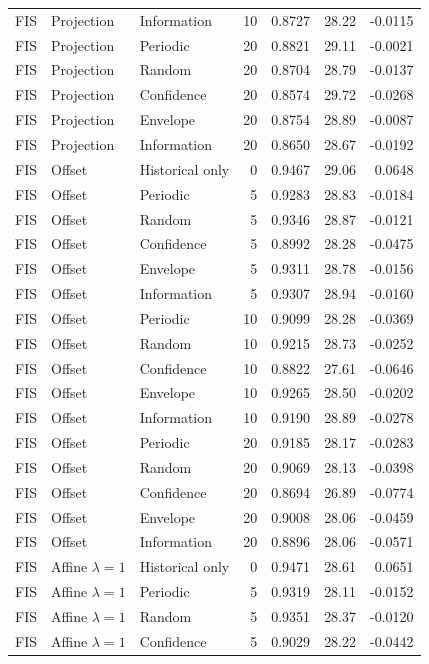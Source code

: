 \begin{longtable}{lllrrrr}
FIS & Projection & Information & 10 & 0.8727 & 28.22 & -0.0115 \\
FIS & Projection & Periodic & 20 & 0.8821 & 29.11 & -0.0021 \\
FIS & Projection & Random & 20 & 0.8704 & 28.79 & -0.0137 \\
FIS & Projection & Confidence & 20 & 0.8574 & 29.72 & -0.0268 \\
FIS & Projection & Envelope & 20 & 0.8754 & 28.89 & -0.0087 \\
FIS & Projection & Information & 20 & 0.8650 & 28.67 & -0.0192 \\
FIS & Offset & Historical only & 0 & 0.9467 & 29.06 & 0.0648 \\
FIS & Offset & Periodic & 5 & 0.9283 & 28.83 & -0.0184 \\
FIS & Offset & Random & 5 & 0.9346 & 28.87 & -0.0121 \\
FIS & Offset & Confidence & 5 & 0.8992 & 28.28 & -0.0475 \\
FIS & Offset & Envelope & 5 & 0.9311 & 28.78 & -0.0156 \\
FIS & Offset & Information & 5 & 0.9307 & 28.94 & -0.0160 \\
FIS & Offset & Periodic & 10 & 0.9099 & 28.28 & -0.0369 \\
FIS & Offset & Random & 10 & 0.9215 & 28.73 & -0.0252 \\
FIS & Offset & Confidence & 10 & 0.8822 & 27.61 & -0.0646 \\
FIS & Offset & Envelope & 10 & 0.9265 & 28.50 & -0.0202 \\
FIS & Offset & Information & 10 & 0.9190 & 28.89 & -0.0278 \\
FIS & Offset & Periodic & 20 & 0.9185 & 28.17 & -0.0283 \\
FIS & Offset & Random & 20 & 0.9069 & 28.13 & -0.0398 \\
FIS & Offset & Confidence & 20 & 0.8694 & 26.89 & -0.0774 \\
FIS & Offset & Envelope & 20 & 0.9008 & 28.06 & -0.0459 \\
FIS & Offset & Information & 20 & 0.8896 & 28.06 & -0.0571 \\
FIS & Affine $\lambda=1$ & Historical only & 0 & 0.9471 & 28.61 & 0.0651 \\
FIS & Affine $\lambda=1$ & Periodic & 5 & 0.9319 & 28.11 & -0.0152 \\
FIS & Affine $\lambda=1$ & Random & 5 & 0.9351 & 28.37 & -0.0120 \\
FIS & Affine $\lambda=1$ & Confidence & 5 & 0.9029 & 28.22 & -0.0442 \\

\end{longtable}
